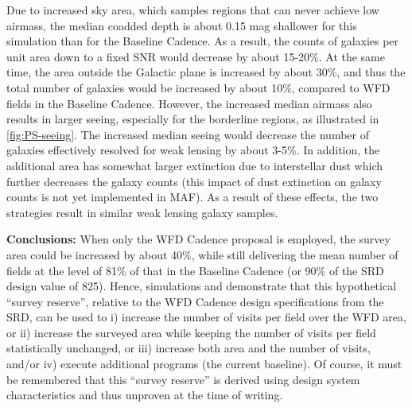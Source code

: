 Due to increased sky area, which samples regions that can never
achieve low airmass, the median coadded depth is about 0.15 mag
shallower for this simulation than for the Baseline Cadence. As a result,
the counts of galaxies per unit area down to a fixed SNR would
decrease by about 15-20\%. At the same time, the area outside the
Galactic plane is increased by about 30\%, and thus the total number
of galaxies would be increased by about 10\%, compared to WFD fields
in the Baseline Cadence. However, the increased median airmass also
results in larger seeing, especially for the borderline regions, as
illustrated in \autoref{fig:PS-seeing}. The increased median seeing
would decrease the number of galaxies effectively resolved for weak
lensing by about 3-5\%. In addition, the additional area has somewhat
larger extinction due to interstellar dust which further decreases the
galaxy counts (this impact of dust extinction on galaxy counts is not
yet implemented in MAF). As a result of these effects, the two
strategies result in similar weak lensing galaxy samples.

{\bf Conclusions:} When only the WFD Cadence proposal is
employed, the survey area could be increased by about 40\%, while
still delivering the mean number of fields at the level of 81\% of
that in the Baseline Cadence (or 90\% of the SRD design value of 825).
Hence, simulations  and 
demonstrate that this hypothetical ``survey reserve'', relative to the WFD
Cadence design specifications from the SRD, can be used to i) increase
the number of visits per field over the WFD area, or ii) increase the
surveyed area while keeping the number of visits per field
statistically unchanged, or iii) increase both area and the number of
visits, and/or iv) execute additional programs (the current baseline).
Of course, it must be remembered that this ``survey reserve'' is derived
using design system characteristics and thus unproven at the time of
writing.


